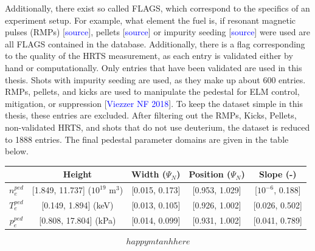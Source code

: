 \documentclass[a4paper, twoside, final, 12pt]{article}
\begin{document}
Additionally, there exist so called FLAGS, which correspond to the specifics of an experiment setup.
For example, what element the fuel is, if resonant magnetic pulses (RMPs) [\textcolor{blue}{source}], pellets [\textcolor{blue}{source}] or impurity seeding [\textcolor{blue}{source}] were used are all FLAGS contained in the database.
Additionally, there is a flag corresponding to the quality of the HRTS measurement, as each entry is validated either by hand or computationally.
Only entries that have been validated are used in this thesis.
Shots with impurity seeding are used, as they make up about 600 entries.
RMPs, pellets, and kicks are used to manipulate the pedestal for ELM control, mitigation, or suppression [\textcolor{blue}{Viezzer NF 2018}].
To keep the dataset simple in this thesis, these entries are excluded.
After filtering out the RMPs, Kicks, Pellets, non-validated HRTS, and shots that do not use deuterium, the dataset is reduced to 1888 entries. The final pedestal parameter domains are given in the table below.
\begin{center}
\begin{tabular}{ | c | c | c | c | c | }
	\hline 
	& Height & Width ($\Psi_N$) & Position ($\Psi_N$) & Slope (-) \\ 
	\hline
	$n_e^{ped}$ &[1.849, 11.737] ($10^{19}$ m$^3$) & [0.015, 0.173]& [0.953, 1.029] & [$10^{-6}$, 0.188] \\
	$T_e^{ped}$ & [0.149, 1.894] (keV)& [0.013, 0.105] & [0.926, 1.002] & [0.026, 0.502] \\
	$p_e^{ped}$ & [0.808, 17.804] (kPa)& [0.014, 0.099] & [0.931, 1.002]& [0.041, 0.789] \\
	\hline
\end{tabular}
\end{center}

\begin{equation} \label{eq:mtanh}
happy mtanh here
\end{equation}
\end{document}
